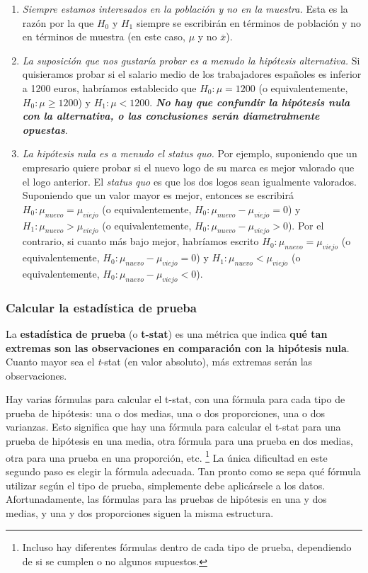 \documentclass[
]{book}
\providecommand{\tightlist}{%
  \setlength{\itemsep}{0pt}\setlength{\parskip}{0pt}}
\begin{document}
\begin{enumerate}
\def\labelenumi{\arabic{enumi}.}
\tightlist
\item
  \emph{Siempre estamos interesados en la población y no en la muestra.} Esta es la razón por la que \(H_0\) y \(H_1\) siempre se escribirán en términos de población y no en términos de muestra (en este caso, \(\mu\) y no \(\overline{x}\)).
\item
  \emph{La suposición que nos gustaría probar es a menudo la hipótesis alternativa.} Si quisieramos probar si el salario medio de los trabajadores españoles es inferior a 1200 euros, habríamos establecido que \(H_0:\mu = 1200\) (o equivalentemente, \(H_0:\mu\ge 1200\)) y \(H_1:\mu<1200\). \textbf{\emph{No hay que confundir la hipótesis nula con la alternativa, o las conclusiones serán diametralmente opuestas}}.
\item
  \emph{La hipótesis nula es a menudo el status quo.} Por ejemplo, suponiendo que un empresario quiere probar si el nuevo logo de su marca es mejor valorado que el logo anterior. El \emph{status quo} es que los dos logos sean igualmente valorados. Suponiendo que un valor mayor es mejor, entonces se escribirá \(H_0:\mu_{nuevo}=\mu_{viejo}\) (o equivalentemente, \(H_0:\mu_{nuevo} - \mu_{viejo} = 0\)) y \(H_1:\mu_{nuevo}>\mu_{viejo}\) (o equivalentemente, \(H_0:\mu_{nuevo} - \mu_{viejo}> 0\)). Por el contrario, si cuanto más bajo mejor, habríamos escrito \(H_0: \mu_{nuevo} = \mu_{viejo}\) (o equivalentemente, \(H_0: \mu_{nuevo} - \mu_{viejo} = 0\)) y \(H_1:\mu_{nuevo} <\mu_{viejo}\) (o equivalentemente, \(H_0: \mu_{nuevo} - \mu_{viejo}<0\)).
\end{enumerate}

\hypertarget{calcular-la-estaduxedstica-de-prueba}{%
\subsubsection{Calcular la estadística de prueba}\label{calcular-la-estaduxedstica-de-prueba}}

La \textbf{estadística de prueba} (o \textbf{t-stat}) es una métrica que indica \textbf{qué tan extremas son las observaciones en comparación con la hipótesis nula}. Cuanto mayor sea el \emph{t}-stat (en valor absoluto), más extremas serán las observaciones.

Hay varias fórmulas para calcular el t-stat, con una fórmula para cada tipo de prueba de hipótesis: una o dos medias, una o dos proporciones, una o dos varianzas. Esto significa que hay una fórmula para calcular el t-stat para una prueba de hipótesis en una media, otra fórmula para una prueba en dos medias, otra para una prueba en una proporción, etc. \footnote{Incluso hay diferentes fórmulas dentro de cada tipo de prueba, dependiendo de si se cumplen o no algunos supuestos.} La única dificultad en este segundo paso es elegir la fórmula adecuada. Tan pronto como se sepa qué fórmula utilizar según el tipo de prueba, simplemente debe aplicársele a los datos. Afortunadamente, las fórmulas para las pruebas de hipótesis en una y dos medias, y una y dos proporciones siguen la misma estructura.
\end{document}
